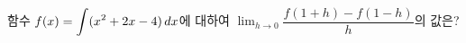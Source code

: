 함수 $f(x)=\displaystyle\int (x^2+2x-4)\mkern3mu dx$에 대하여 $\displaystyle\lim_{h\to 0}\dfrac{f(1+h)-f(1-h)}{h}$의 값은?
